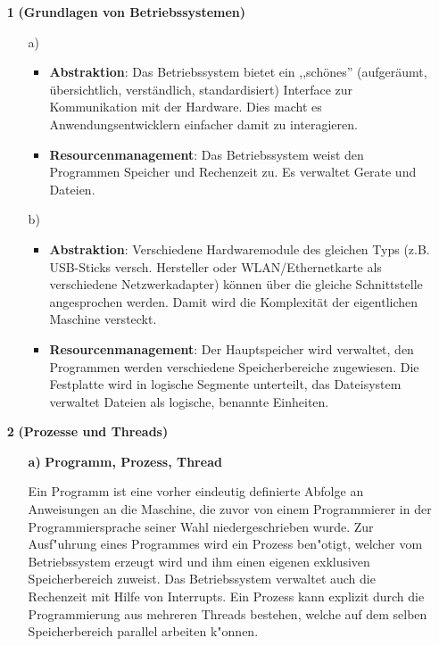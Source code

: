 \documentclass[a4paper,11pt]{article}
\author{\authorinfo}
\title{\titleinfo}
\date{\today}
\begin{document}
\maketitle


\begin{enumerate}
\item[\textbf{1}]
    \textbf{(Grundlagen von Betriebssystemen)}
    \begin{enumerate} 
        \item[a)]
        \begin{itemize}
            \item \textbf{Abstraktion}: Das Betriebssystem bietet ein ,,schönes'' (aufgeräumt, übersichtlich, verständlich, standardisiert) Interface zur Kommunikation mit der Hardware. Dies macht es Anwendungsentwicklern einfacher damit zu interagieren.
            \item \textbf{Resourcenmanagement}: Das Betriebssystem weist den Programmen Speicher und Rechenzeit zu. Es verwaltet Gerate und Dateien. 

        \end{itemize}
        \item[b)]
        \begin{itemize}
            \item \textbf{Abstraktion}: Verschiedene Hardwaremodule des gleichen Typs (z.B. USB-Sticks versch. Hersteller oder WLAN/Ethernetkarte als verschiedene Netzwerkadapter) können über die gleiche Schnittstelle angesprochen werden. Damit wird die Komplexität der eigentlichen Maschine versteckt.  
            \item \textbf{Resourcenmanagement}: Der Hauptspeicher wird verwaltet, den Programmen werden verschiedene Speicherbereiche zugewiesen. Die Festplatte wird in logische Segmente unterteilt, das Dateisystem verwaltet Dateien als logische, benannte Einheiten.
        \end{itemize}   
    \end{enumerate}
\item[\textbf{2}]
    \textbf{(Prozesse und Threads)}

    \begin{enumerate}
        \item[\textbf{a)}]
            \textbf{Programm, Prozess, Thread}

            Ein Programm ist eine vorher eindeutig definierte Abfolge an Anweisungen an die Maschine,
            die zuvor von einem Programmierer in der Programmiersprache seiner Wahl niedergeschrieben wurde. Zur Ausf"uhrung eines Programmes wird ein Prozess ben"otigt, welcher vom Betriebssystem erzeugt wird und ihm einen eigenen exklusiven Speicherbereich zuweist.
            Das Betriebssystem verwaltet auch die Rechenzeit mit Hilfe von Interrupts. 
            Ein Prozess kann explizit durch die Programmierung aus mehreren Threads bestehen, welche auf dem selben Speicherbereich parallel arbeiten k"onnen.


\end{enumerate}
\end{enumerate}
\end{document}
